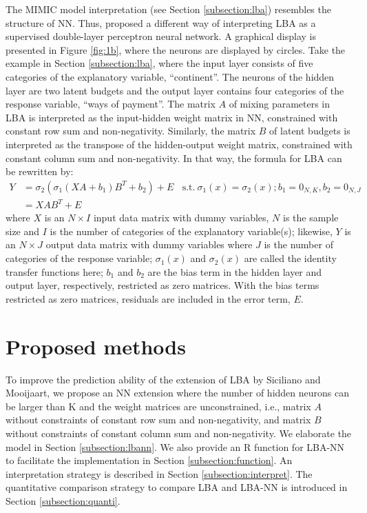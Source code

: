 \documentclass[]{interact}
\theoremstyle{plain}%
\theoremstyle{definition}
\theoremstyle{remark}
\begin{document}
The MIMIC model interpretation (see Section \ref{subsection:lba})
resembles the structure of NN. Thus, \cite{SM2001} proposed a different
way of interpreting LBA as a supervised double-layer perceptron neural
network. A graphical display is presented in Figure \ref{fig:1b}, where
the neurons are displayed by circles. Take the example in Section
\ref{subsection:lba}, where the input layer consists of five categories
of the explanatory variable, ``continent''. The neurons of the hidden
layer are two latent budgets and the output layer contains four
categories of the response variable, ``ways of payment''. The matrix
\(A\) of mixing parameters in LBA is interpreted as the input-hidden
weight matrix in NN, constrained with constant row sum and
non-negativity. Similarly, the matrix \(B\) of latent budgets is
interpreted as the transpose of the hidden-output weight matrix,
constrained with constant column sum and non-negativity. In that way,
the formula for LBA can be rewritten by: \begin{align*}
\label{equ:siciliano}
    Y & = \sigma_2(\sigma_1(XA + b_1)B^T + b_2) + E \ \ \ \ \mathrm{s.t.} \ \sigma_1(x) = \sigma_2(x); b_1 = 0_{N,K}, b_2 = 0_{N,J} \\
    & = XAB^T + E \tag{2}
\end{align*} where \(X\) is an \(N \times I\) input data matrix with
dummy variables, \(N\) is the sample size and \(I\) is the number of
categories of the explanatory variable(s); likewise, \(Y\) is an
\(N \times J\) output data matrix with dummy variables where \(J\) is
the number of categories of the response variable; \(\sigma_1(x)\) and
\(\sigma_2(x)\) are called the identity transfer functions here; \(b_1\)
and \(b_2\) are the bias term in the hidden layer and output layer,
respectively, restricted as zero matrices. With the bias terms
restricted as zero matrices, residuals are included in the error term,
\(E\).

\hypertarget{sec:method}{%
\section{Proposed methods}\label{sec:method}}

To improve the prediction ability of the extension of LBA by Siciliano
and Mooijaart, we propose an NN extension where the number of hidden
neurons can be larger than K and the weight matrices are unconstrained,
i.e., matrix \(A\) without constraints of constant row sum and
non-negativity, and matrix \(B\) without constraints of constant column
sum and non-negativity. We elaborate the model in Section
\ref{subsection:lbann}. We also provide an R function for LBA-NN to
facilitate the implementation in Section \ref{subsection:function}. An
interpretation strategy is described in Section
\ref{subsection:interpret}. The quantitative comparison strategy to
compare LBA and LBA-NN is introduced in Section \ref{subsection:quanti}.
\end{document}
